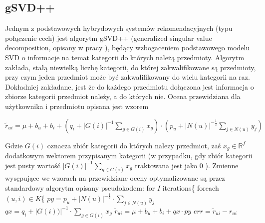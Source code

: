 \documentclass{pracamgr}
\begin{document}
   \subsection{gSVD++}
    Jednym z podstawowych hybrydowych systemów rekomendacyjnych (typu połączenie cech) jest algorytm gSVD++
    (generalized singular value decomposition, opisany w pracy \cite{gSVD++}),
    będący wzbogaceniem podstawowego modelu SVD o informacje na temat kategorii do których należą przedmioty.
    Algorytm zakłada, stałą niewielką liczbę kategorii, do której zakwalifikowane są przedmioty, przy czym jeden przedmiot może być zakwalifikowany do wielu
    kategorii na raz.
    Dokładniej zakładane, jest że do każdego przedmiotu dołączona jest informacja o zbiorze kategorii przedmiot należy, a do których nie.\newline
    Ocena przewidziana dla użytkownika i przedmiotu opisana jest wzorem
    \begin{center}
     $\tilde{r}_{ui}=\mu+b_u+b_i+\left(q_i+|G(i)|^{-1}\sum\limits_{g\in G(i)}x_{g}\right)\cdot\left(p_u +|N(u)|^{-\frac{1}{2}}\sum\limits_{j\in N(u)}y_j\right)$
    \end{center}
    Gdzie $G(i)$ oznacza zbiór kategorii do których nalezy przedmiot, zaś $x_{g}\in\mathbb{R}^f$ dodatkowym wektorem przypisanym kategorii
    (w przypadku, gdy zbiór kategorii jest pusty wartość $|G(i)|^{-1}\sum\limits_{g\in G(i)}x_{g}$ traktowana jest jako $0$ ).
    Zmienne wysępujące we wzorach na przewidziane oceny optymalizowane są przez standardowy algorytm opisany pseudokodem:\newline
    \hspace*{16pt}	for $I$ iterations\{\newline
    \hspace*{32pt}		foreach $(u,i)\in K$\{\newline
    \hspace*{48pt}			$py=p_u +|N(u)|^{-\frac{1}{2}}\cdot\sum\limits_{j\in N(u)}y_j$\newline
    \hspace*{48pt}			$qx=q_i +|G(i))|^{-1}\cdot\sum\limits_{g\in G(i)}x_g$\newline
    \hspace*{48pt}			$\tilde{r}_{ui}=\mu+b_u+b_i+qx\cdot py$\newline
    \hspace*{48pt}			$err=\tilde{r}_{ui}-r_{ui}$\newline
\end{document}
